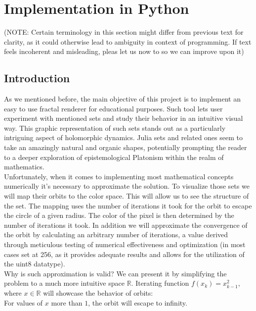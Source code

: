 \documentclass{article}
\begin{document}
\newpage

\section{Implementation in Python}

\begin{center}
	\scriptsize(NOTE: Certain terminology in this section might differ from previous text for clarity, as it could otherwise lead to ambiguity in context of programming. If text feels incoherent and misleading, pleas let us now to so we can improve upon it)
\end{center}

\subsection{Introduction}
As we mentioned before, the main objective of this project is to implement an easy to use fractal renderer for educational purposes. Such tool lets user experiment with mentioned sets and study their behavior in an intuitive visual way. This graphic representation of such sets stands out as a particularly intriguing aspect of holomorphic dynamics. Julia sets and related ones seem to take an amazingly natural and organic shapes, potentially prompting the reader to a deeper exploration of epistemological Platonism within the realm of mathematics. 
\\[1\baselineskip]
Unfortunately, when it comes to implementing most mathematical concepts numerically it's necessary to approximate the solution.
To visualize those sets we will map their orbits to the color space. This will allow us to see the structure of the set. The mapping uses the number of iterations it took for the orbit to escape the circle of a given radius. The color of the pixel is then determined by the number of iterations it took. In addition we will approximate the convergence of the orbit by calculating an arbitrary number of iterations, a value derived through meticulous testing of numerical effectiveness and optimization (in most cases set at 256, as it provides adequate results and allows for the utilization of the uint8 datatype).
\\[1\baselineskip]
Why is such approximation is valid? We can present it by simplifying the problem to a much more intuitive space $\mathbb{R}$. Iterating function $f(x_k) = x_{k-1}^2$, where $x \in \mathbb{R}$ will showcase the behavior of orbits:
\\[1\baselineskip]
For values of $x$ more than $1$, the orbit will escape to infinity. \\ 
\end{document}
